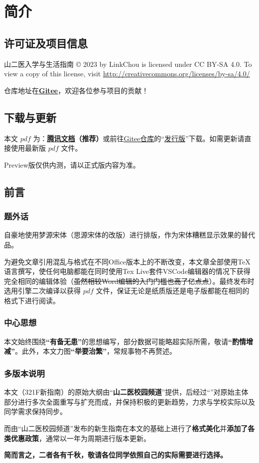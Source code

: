 \chapter[简介]{简介}

\section[许可证及项目信息]{许可证及项目信息}
山二医入学与生活指南 © 2023 by LinkChou is licensed under CC BY-SA 4.0. To view a copy of this license, visit \uline{\href{http://creativecommons.org/licenses/by-sa/4.0/}{http://creativecommons.org/licenses/by-sa/4.0/}}

仓库地址在\textbf{\uline{\href{https://gitee.com/mikazo/guide_for_freshman}{Gitee}}}，欢迎各位参与项目的贡献！

\section[\textcolor{red}{下载与更新}]{下载与更新}
本文 $pdf$ \textbf{}为：\textbf{\uline{\textcolor{red}{\href{https://docs.qq.com/s/ETcQ-ZFSrSsh6MK9bm773q}{腾讯文档}}}（推荐）}或前往\uline{\href{https://gitee.com/mikazo/guide_for_freshman}{Gitee仓库}}的“\uline{\href{https://gitee.com/mikazo/latex_version/releases/latest}{发行版}}”下载。如需更新请直接使用最新版 $pdf$ 文件。

Preview版仅供内测，请以正式版内容为准。

\section[前言]{前言}
\subsection[题外话]{题外话}
自豪地使用梦源宋体（思源宋体的改版）进行排版，作为宋体糟糕显示效果的替代品。

为避免文章引用混乱与格式在不同Office版本上的不断改变，本文章全部使用\TeX 语言撰写，使任何电脑都能在同时使用Tex Live套件VSCode编辑器\footnotemark 的情况下获得完全相同的编辑体验（\sout{虽然相较Word编辑的入门门槛也高了亿点点}）。最终发布时选用\XeLaTeX 引擎二次编译以获得 $pdf$ 文件，保证无论是纸质版还是电子版都能在相同的格式下进行阅读。

\subsection[中心思想]{中心思想}
本文始终围绕\textbf{“有备无患”}的思想编写，部分数据可能略超实际所需，敬请\textbf{“酌情增减”}。此外，本文力图\textbf{“举要治繁”}，常规事物不再赘述。

\subsection[多版本说明]{多版本说明}
本文（321F新指南）的原始大纲由“\textbf{山二医校园频道}”提供，后经过“\textbf{}”对原始主体部分进行多次全面重写与扩充而成，并保持积极的更新趋势，力求与学校实际以及同学需求保持同步。

而由“山二医校园频道”发布的新生指南在本文的基础上进行了\textbf{格式美化}并\textbf{添加了各类优惠政策}，通常以一年为周期进行版本更新。

\textbf{简而言之，二者各有千秋，敬请各位同学依照自己的实际需要进行选择。}
